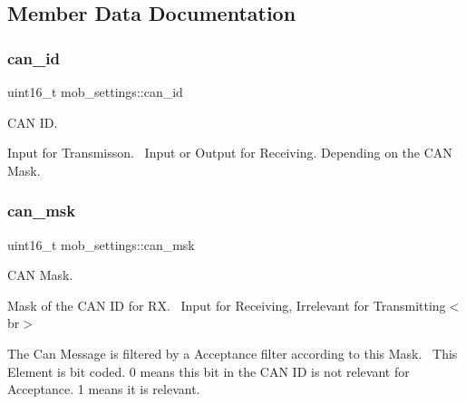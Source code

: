 \subsection{Member Data Documentation}
\hypertarget{structmob__settings_a45cb3ff981e8309e106c70339f15df52}{}\label{structmob__settings_a45cb3ff981e8309e106c70339f15df52} 
\subsubsection{\texorpdfstring{can\+\_\+id}{can\_id}}
{\footnotesize\ttfamily uint16\+\_\+t mob\+\_\+settings\+::can\+\_\+id}



C\+AN ID. 

Input for Transmisson.~\newline
 Input or Output for Receiving. Depending on the C\+AN Mask.~\newline
 \hypertarget{structmob__settings_a87ca4f26ce4d508ad0813ed4176bb091}{}\label{structmob__settings_a87ca4f26ce4d508ad0813ed4176bb091} 
\subsubsection{\texorpdfstring{can\+\_\+msk}{can\_msk}}
{\footnotesize\ttfamily uint16\+\_\+t mob\+\_\+settings\+::can\+\_\+msk}



C\+AN Mask. 

Mask of the C\+AN ID for RX.~\newline
 Input for Receiving, Irrelevant for Transmitting$<$br$>$~\newline


The Can Message is filtered by a Acceptance filter according to this Mask.~\newline
 This Element is bit coded. 0 means this bit in the C\+AN ID is not relevant for Acceptance. 1 means it is relevant.~\newline


